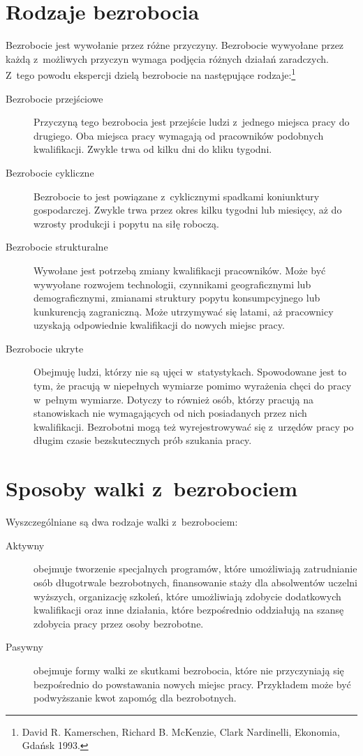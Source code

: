 \documentclass[12pt]{article}
\begin{document}
    \section*{Rodzaje bezrobocia}
    Bezrobocie jest wywołanie przez różne przyczyny. Bezrobocie wywyołane przez każdą z~możliwych przyczyn wymaga podjęcia różnych działań zaradczych. Z~tego powodu ekspercji dzielą bezrobocie na następujące rodzaje:\footnote{David R. Kamerschen, Richard B. McKenzie, Clark Nardinelli, Ekonomia, Gdańsk 1993.}
    \begin{description}
        \item[Bezrobocie przejściowe] Przyczyną tego bezrobocia jest przejście ludzi z~jednego miejsca pracy do drugiego. Oba miejsca pracy wymagają od pracowników podobnych kwalifikacji. Zwykle trwa od kilku dni do kliku tygodni.
        \item[Bezrobocie cykliczne] Bezrobocie to jest powiązane z~cyklicznymi spadkami koniunktury gospodarczej. Zwykle trwa przez okres kilku tygodni lub miesięcy, aż do wzrosty produkcji i popytu na siłę roboczą.
        \item[Bezrobocie strukturalne] Wywołane jest potrzebą zmiany kwalifikacji pracowników. Może być wywyołane rozwojem technologii, czynnikami geograficznymi lub demograficznymi, zmianami struktury popytu konsumpcyjnego lub kunkurencją zagraniczną. Może utrzymywać się latami, aż pracownicy uzyskają odpowiednie kwalifikacji do nowych miejsc pracy.
        \item[Bezrobocie ukryte] Obejmuję ludzi, którzy nie są ujęci w~statystykach. Spowodowane jest to tym, że pracują w niepełnych wymiarze pomimo wyrażenia chęci do pracy w~pełnym wymiarze. Dotyczy to również osób, którzy pracują na stanowiskach nie wymagających od nich posiadanych przez nich kwalifikacji. Bezrobotni mogą też wyrejestrowywać się z~urzędów pracy po długim czasie bezskutecznych prób szukania pracy.
    \end{description}

    \section*{Sposoby walki z~bezrobociem}
    
    Wyszczególniane są dwa rodzaje walki z~bezrobociem:
    
    \begin{description}
        \item[Aktywny] obejmuje tworzenie specjalnych programów, które umożliwiają zatrudnianie osób długotrwale bezrobotnych, finansowanie staży dla absolwentów uczelni wyższych, organizację szkoleń, które umożliwiają zdobycie dodatkowych kwalifikacji oraz inne działania, które bezpośrednio oddziałują na szansę zdobycia pracy przez osoby bezrobotne.
        \item[Pasywny] obejmuje formy walki ze skutkami bezrobocia, które nie przyczyniają się bezpośrednio do powstawania nowych miejsc pracy. Przykładem może być podwyższanie kwot zapomóg dla bezrobotnych.
    \end{description}
   
\end{document}
